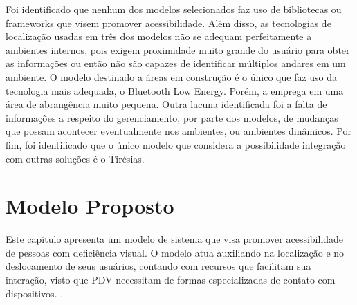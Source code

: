 \documentclass[english,brazilian]{UNISINOSmonografia}
\begin{document}
Foi identificado que nenhum dos modelos selecionados faz uso de bibliotecas ou frameworks que visem promover acessibilidade. Além disso, as tecnologias de localização usadas em três dos modelos não se adequam perfeitamente a ambientes internos, pois exigem proximidade muito grande do usuário para obter as informações ou então não são capazes de identificar múltiplos andares em um ambiente. O modelo destinado a áreas em construção é o único que faz uso da tecnologia mais adequada, o Bluetooth Low Energy. Porém, a emprega em uma área de abrangência muito pequena.
Outra lacuna identificada foi a falta de informações a respeito do gerenciamento, por parte dos modelos, de mudanças que possam acontecer eventualmente nos ambientes, ou ambientes dinâmicos. Por fim, foi identificado que o único modelo que considera a possibilidade integração com outras soluções é o Tirésias.

\chapter{Modelo Proposto}


Este capítulo apresenta um modelo de sistema que visa promover acessibilidade de pessoas com deficiência visual. O modelo atua auxiliando na localização e no deslocamento de seus usuários, contando com recursos que facilitam sua interação, visto que PDV necessitam de formas especializadas de contato com dispositivos. .
\end{document}
